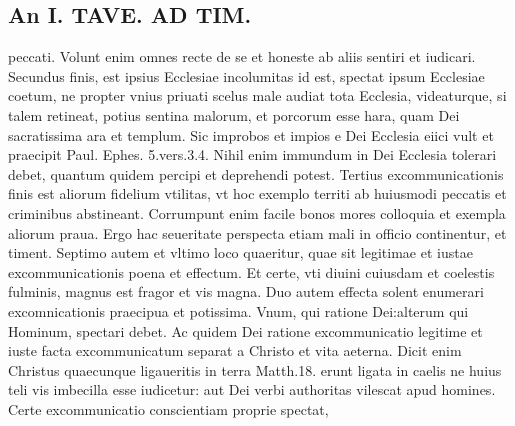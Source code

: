\documentclass{article}
\begin{document}
\begin{pages}
\section*{An I. TAVE. AD TIM. }
\marginpar{[ p.403 ]}\pstart peccati. Volunt enim omnes recte de se et honeste ab aliis sentiri et iudicari. Secundus finis, est ipsius Ecclesiae incolumitas id est, spectat ipsum Ecclesiae coetum, ne propter vnius priuati scelus male audiat tota Ecclesia, videaturque, si talem retineat, potius sentina malorum, et porcorum esse hara, quam Dei sacratissima ara et templum. Sic improbos et impios e Dei Ecclesia eiici vult et praecipit Paul. Ephes. 5.vers.3.4. Nihil enim immundum in Dei Ecclesia tolerari debet, quantum quidem percipi et deprehendi potest. Tertius excommunicationis finis est aliorum fidelium vtilitas, vt hoc exemplo territi ab huiusmodi peccatis et criminibus abstineant. Corrumpunt enim facile bonos mores colloquia et exempla aliorum praua. Ergo hac seueritate perspecta etiam mali in officio continentur, et timent. Septimo autem et vltimo loco quaeritur, quae sit legitimae et iustae excommunicationis poena et effectum. Et certe, vti diuini cuiusdam et coelestis fulminis, magnus est fragor et vis magna. Duo autem effecta solent enumerari excomnicationis praecipua et potissima. Vnum, qui ratione Dei:alterum qui Hominum, spectari debet. Ac quidem Dei ratione excommunicatio legitime et iuste facta excommunicatum separat a Christo et vita aeterna. Dicit enim Christus quaecunque ligaueritis in terra Matth.18. erunt ligata in caelis ne huius teli vis imbecilla esse iudicetur: aut Dei verbi authoritas vilescat apud homines. Certe excommunicatio conscientiam proprie spectat,  \pend

\end{pages}
\end{document}

